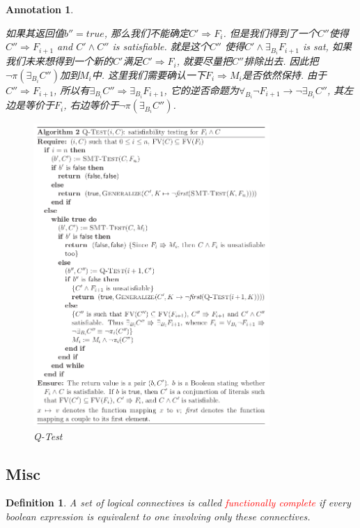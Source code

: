 \documentclass{article}
\newtheorem{definition}[theorem]{Definition}
\newtheorem{annotation}[theorem]{Annotation}
\newcommand{\redt}[1]{\textcolor{red}{#1}}
\begin{document}
\begin{annotation}
\begin{itemize}
\begin{itemize}
        如果其返回值$b'' = true$, 那么我们不能确定$C' \Rightarrow F_i$. 但是我们得到了一个$C''$使得$C'' \Rightarrow F_{i+1}$ and $C' \wedge C''$ is satisfiable. 就是这个$C''$ 使得$C' \wedge \exists_{B_i} F_{i+1}$ is sat, 如果我们未来想得到一个新的$C'$满足$C' \Rightarrow F_i$, 就要尽量把$C''$排除出去. 因此把$\neg \pi(\exists_{B_i} C'')$加到$M_i$中. 这里我们需要确认一下$F_i \Rightarrow M_i$是否依然保持. 由于$C'' \Rightarrow F_{i+1}$, 所以有$\exists_{B_i} C'' \Rightarrow \exists_{B_i} F_{i+1}$, 它的逆否命题为$\forall_{B_i} \neg F_{i+1} \to \neg \exists_{B_i} C''$, 其左边是等价于$F_i$, 右边等价于$\neg \pi(\exists_{B_i} C'')$.
    \end{itemize}
\end{itemize}
\begin{figure}[H]
    \centering
    \includegraphics[width=0.8\textwidth]{images/qe-sat.png}
    \caption{Q-Test}
    \label{fig:qe-sat}
\end{figure}
\end{annotation}

\newpage
\subsection{Misc}

\begin{definition}
\rm A set of logical connectives is called \redt{functionally complete} if every boolean expression is equivalent to one involving only these connectives.
\end{definition}
\end{document}
